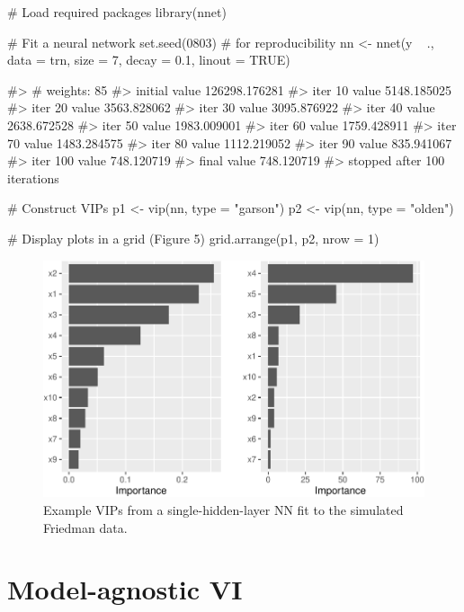 \begin{Schunk}
\begin{Sinput}
# Load required packages
library(nnet)

# Fit a neural network
set.seed(0803)  # for reproducibility
nn <- nnet(y ~ ., data = trn, size = 7, decay = 0.1, linout = TRUE)
\end{Sinput}
\begin{Soutput}
#> # weights:  85
#> initial  value 126298.176281 
#> iter  10 value 5148.185025
#> iter  20 value 3563.828062
#> iter  30 value 3095.876922
#> iter  40 value 2638.672528
#> iter  50 value 1983.009001
#> iter  60 value 1759.428911
#> iter  70 value 1483.284575
#> iter  80 value 1112.219052
#> iter  90 value 835.941067
#> iter 100 value 748.120719
#> final  value 748.120719 
#> stopped after 100 iterations
\end{Soutput}
\begin{Sinput}
# Construct VIPs
p1 <- vip(nn, type = "garson")
p2 <- vip(nn, type = "olden")

# Display plots in a grid (Figure 5)
grid.arrange(p1, p2, nrow = 1)
\end{Sinput}
\begin{figure}[!htb]

{\centering \includegraphics[width=0.7\linewidth]{greenwell-boehmke_files/figure-latex/vip-nnet-1} 

}

\caption[Example VIPs from a single-hidden-layer NN fit to the simulated Friedman data]{Example VIPs from a single-hidden-layer NN fit to the simulated Friedman data.}\label{fig:vip-nnet}
\end{figure}
\end{Schunk}

\section{Model-agnostic VI}

